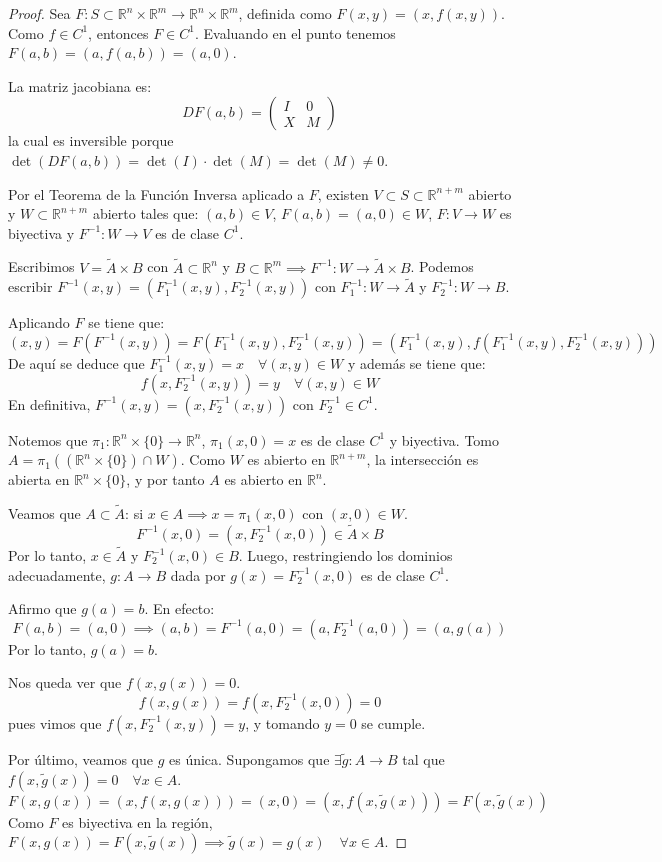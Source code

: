 \begin{proof}
    Sea \(F: S \subset \mathbb{R}^n \times \mathbb{R}^m \to \mathbb{R}^n \times \mathbb{R}^m\), definida como \(F(x,y) = (x, f(x,y))\). Como \(f \in C^1\), entonces \(F \in C^1\).
    Evaluando en el punto tenemos \(F(a,b) = (a, f(a,b)) = (a,0)\).

    La matriz jacobiana es:
    \[ DF(a,b) = \begin{pmatrix} I & 0 \\ X & M \end{pmatrix} \]
    la cual es inversible porque \(\det(DF(a,b)) = \det(I) \cdot \det(M) = \det(M) \neq 0\).

    Por el Teorema de la Función Inversa aplicado a \(F\), existen \(V \subset S \subset \mathbb{R}^{n+m}\) abierto y \(W \subset \mathbb{R}^{n+m}\) abierto tales que:
    \((a,b) \in V\), \(F(a,b) = (a,0) \in W\), \(F: V \to W\) es biyectiva y \(F^{-1}: W \to V\) es de clase \(C^1\).

    Escribimos \(V = \tilde{A} \times B\) con \(\tilde{A} \subset \mathbb{R}^n\) y \(B \subset \mathbb{R}^m \implies F^{-1}: W \to \tilde{A} \times B\).
    Podemos escribir \(F^{-1}(x,y) = (F_1^{-1}(x,y), F_2^{-1}(x,y))\) con \(F_1^{-1}: W \to \tilde{A}\) y \(F_2^{-1}: W \to B\).

    Aplicando \(F\) se tiene que:
    \[ (x,y) = F(F^{-1}(x,y)) = F(F_1^{-1}(x,y), F_2^{-1}(x,y)) = (F_1^{-1}(x,y), f(F_1^{-1}(x,y), F_2^{-1}(x,y))) \]
    De aquí se deduce que \(F_1^{-1}(x,y) = x \quad \forall (x,y) \in W\) y además se tiene que:
    \[ f(x, F_2^{-1}(x,y)) = y \quad \forall (x,y) \in W \]
    En definitiva, \(F^{-1}(x,y) = (x, F_2^{-1}(x,y))\) con \(F_2^{-1} \in C^1\).

    Notemos que \(\pi_1: \mathbb{R}^n \times \{0\} \to \mathbb{R}^n\), \(\pi_1(x,0) = x\) es de clase \(C^1\) y biyectiva.
    Tomo \(A = \pi_1( (\mathbb{R}^n \times \{0\}) \cap W )\). Como \(W\) es abierto en \(\mathbb{R}^{n+m}\), la intersección es abierta en \(\mathbb{R}^n \times \{0\}\), y por tanto \(A\) es abierto en \(\mathbb{R}^n\).

    Veamos que \(A \subset \tilde{A}\): si \(x \in A \implies x = \pi_1(x,0)\) con \((x,0) \in W\).
    \[ F^{-1}(x,0) = (x, F_2^{-1}(x,0)) \in \tilde{A} \times B \]
    Por lo tanto, \(x \in \tilde{A}\) y \(F_2^{-1}(x,0) \in B\).
    Luego, restringiendo los dominios adecuadamente, \(g: A \to B\) dada por \(g(x) = F_2^{-1}(x,0)\) es de clase \(C^1\).

    Afirmo que \(g(a) = b\). En efecto:
    \[ F(a,b) = (a,0) \implies (a,b) = F^{-1}(a,0) = (a, F_2^{-1}(a,0)) = (a, g(a)) \]
    Por lo tanto, \(g(a) = b\).

    Nos queda ver que \(f(x,g(x)) = 0\).
    \[ f(x, g(x)) = f(x, F_2^{-1}(x,0)) = 0 \]
    pues vimos que \(f(x, F_2^{-1}(x,y)) = y\), y tomando \(y=0\) se cumple.

    Por último, veamos que \(g\) es única.
    Supongamos que \(\exists \tilde{g}: A \to B\) tal que \(f(x, \tilde{g}(x)) = 0 \quad \forall x \in A\).
    \[ F(x, g(x)) = (x, f(x, g(x))) = (x, 0) = (x, f(x, \tilde{g}(x))) = F(x, \tilde{g}(x)) \]
    Como \(F\) es biyectiva en la región, \(F(x, g(x)) = F(x, \tilde{g}(x)) \implies \tilde{g}(x) = g(x) \quad \forall x \in A\).
\end{proof}